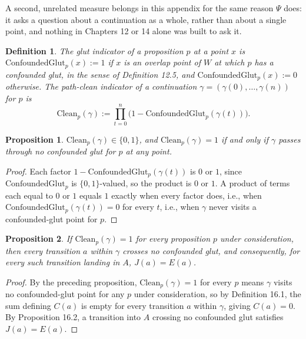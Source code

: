 \documentclass[11pt]{book}
\newtheorem*{appendixdefinition}{Definition}
\newtheorem*{appendixproposition}{Proposition}
\begin{document}
A second, unrelated measure belongs in this appendix for the same reason $\Psi$ does: it asks a question about a continuation as a whole, rather than about a single point, and nothing in Chapters 12 or 14 alone was built to ask it.

\begin{appendixdefinition}
The \emph{glut indicator} of a proposition $p$ at a point $x$ is $\mathrm{ConfoundedGlut}_p(x) := 1$ if $x$ is an overlap point of $W$ at which $p$ has a confounded glut, in the sense of Definition 12.5, and $\mathrm{ConfoundedGlut}_p(x) := 0$ otherwise. The \emph{path-clean indicator} of a continuation $\gamma = (\gamma(0), \dots, \gamma(n))$ for $p$ is
\[
\mathrm{Clean}_p(\gamma) := \prod_{t=0}^{n} \big(1 - \mathrm{ConfoundedGlut}_p(\gamma(t))\big).
\]
\end{appendixdefinition}

\begin{appendixproposition}
$\mathrm{Clean}_p(\gamma) \in \{0,1\}$, and $\mathrm{Clean}_p(\gamma) = 1$ if and only if $\gamma$ passes through no confounded glut for $p$ at any point.
\end{appendixproposition}

\begin{proof}
Each factor $1 - \mathrm{ConfoundedGlut}_p(\gamma(t))$ is $0$ or $1$, since $\mathrm{ConfoundedGlut}_p$ is $\{0,1\}$-valued, so the product is $0$ or $1$. A product of terms each equal to $0$ or $1$ equals $1$ exactly when every factor does, i.e., when $\mathrm{ConfoundedGlut}_p(\gamma(t)) = 0$ for every $t$, i.e., when $\gamma$ never visits a confounded-glut point for $p$.
\end{proof}

\begin{appendixproposition}
If $\mathrm{Clean}_p(\gamma) = 1$ for every proposition $p$ under consideration, then every transition $a$ within $\gamma$ crosses no confounded glut, and consequently, for every such transition landing in $A$, $J(a) = E(a)$.
\end{appendixproposition}

\begin{proof}
By the preceding proposition, $\mathrm{Clean}_p(\gamma) = 1$ for every $p$ means $\gamma$ visits no confounded-glut point for any $p$ under consideration, so by Definition 16.1, the sum defining $C(a)$ is empty for every transition $a$ within $\gamma$, giving $C(a) = 0$. By Proposition 16.2, a transition into $A$ crossing no confounded glut satisfies $J(a) = E(a)$.
\end{proof}
\end{document}
